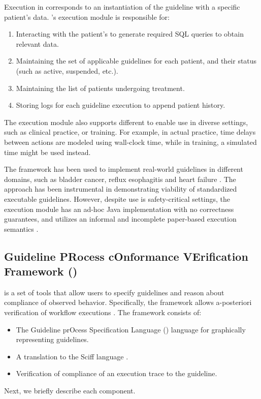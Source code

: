Execution in \GLARE{} corresponds to an instantiation of the guideline
with a specific patient's data. \GLARE{}'s execution module is responsible
for:
\begin{enumerate}[label=\arabic*)]
  \item Interacting with the patient's \EHR{} to generate
    required SQL \cite{SQLBook89} queries to obtain relevant data.
  \item Maintaining the set of applicable guidelines for each patient, and their
    status (such as active, suspended, etc.).
  \item Maintaining the list of patients undergoing treatment.
  \item Storing logs for each guideline execution to append patient history.
\end{enumerate}
The execution module also supports different 
to enable use in diverse settings, such as clinical practice, or training.
For example, in actual practice, time delays between actions are modeled
using wall-clock time, while in training, a simulated time might be used instead.

The \GLARE{} framework has been used to implement real-world guidelines in
different domains, such as bladder cancer, reflux esophagitis
and heart failure \cite{TerenzianiBook04}. The approach has been instrumental in
demonstrating viability of standardized executable guidelines. However, despite use is
safety-critical settings, the execution module has an ad-hoc Java
implementation with no correctness guarantees, and utilizes
an informal and incomplete paper-based execution semantics \cite{TerenzianiAIM01}.

\subsection{Guideline PRocess cOnformance VErification Framework (\GPROVE{})}\label{sec:gprove}

\GPROVE{} is a set of tools that allow users to specify guidelines and
reason about compliance of observed behavior. Specifically,
the framework allows a-posteriori verification of workflow executions \cite{ChesaniISMIS06}.
The \GPROVE{} framework consists of:
\begin{itemize}
  \item The Guideline prOcess Specification Language (\GOSPEL{}) language for graphically representing guidelines.
  \item A translation to the Sciff language \cite{AlbertiTOCL08}.
  \item Verification of compliance of an execution trace to the guideline.
\end{itemize}
Next, we briefly describe each component.

